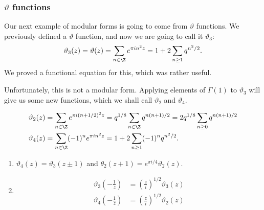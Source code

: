 \documentclass[a4paper]{article}
\begin{document}
\subsubsection*{\texorpdfstring{$\vartheta$}{theta} functions}
Our next example of modular forms is going to come from $\vartheta$ functions. We previously defined a $\vartheta$ function, and now we are going to call it $\vartheta_3$:
\[
  \vartheta_3(z) = \vartheta(z) = \sum_{n \in \Z} e^{\pi in^2 z} = 1 + 2 \sum_{n \geq 1} q^{n^2/2}.
\]
We proved a functional equation for this, which was rather useful.

Unfortunately, this is not a modular form. Applying elements of $\Gamma(1)$ to $\vartheta_3$ will give us some new functions, which we shall call $\vartheta_2$ and $\vartheta_4$.

\begin{defi}
  \begin{align*}
    \vartheta_2(z) &= \sum_{n \in \Z} e^{\pi i (n + 1/2)^2 z} = q^{1/8} \sum_{n \in \Z} q^{n(n + 1)/2} = 2 q^{1/8} \sum_{n \geq 0} q^{n(n + 1)/2}\\
    \vartheta_4(z) &= \sum_{n \in \Z} (-1)^n e^{\pi i n^2 z} = 1 + 2 \sum_{n \geq 1} (-1)^n q^{n^2/2}.
  \end{align*}
\end{defi}

\begin{thm}\leavevmode
  \begin{enumerate}
    \item $\vartheta_4(z) = \vartheta_3(z \pm 1)$ and $\theta_2(z + 1) = e^{\pi i/4} \vartheta_2(z)$.
    \item
      \begin{align*}
        \vartheta_3\left(-\frac{1}{z}\right) &= \left(\frac{z}{i}\right)^{1/2} \vartheta_3(z)\\
        \vartheta_4 \left(-\frac{1}{z}\right) &= \left(\frac{z}{i}\right)^{1/2} \vartheta_2(z)
      \end{align*}
  \end{enumerate}
\end{thm}
\end{document}
